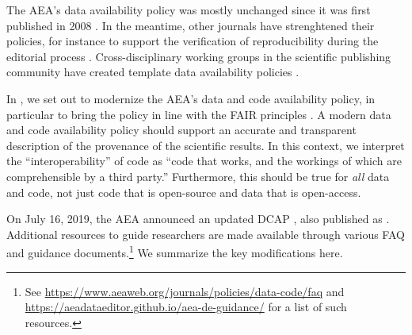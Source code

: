 \documentclass[PP]{AEA}
\begin{document}
The \ac{AEA}'s data availability policy was mostly unchanged since it was first published in 2008 \citep{American_Economic_Association2008-wayback}. In the meantime, other journals have strenghtened their policies, for instance to support the verification of reproducibility during the editorial process \citep{JacobyInsideHigherEd2017,Christian2018}. Cross-disciplinary working groups in the scientific publishing community have created template data availability policies \citep{HrynaszkiewiczInt.J.Digit.Curation2017}. 

In  \citet{10.1257/pandp.109.718}, we set out to modernize the AEA's data and code availability policy, in particular to bring the policy in line with  the \ac{FAIR} principles \citep{FORCE11FAIRDATAPRINCIPLES}.  A modern data and code availability policy should support an accurate and transparent description of the provenance of the scientific results.  In this context, we interpret the ``interoperability'' of code as ``code that works, and the workings of which are comprehensible by a third party.'' Furthermore, this should be true for \textit{all} data and code, not just code that is open-source and data that is open-access.


On July 16, 2019, the AEA announced an updated \ac{DCAP} \citep{AEA-announcement-July-2019}, also published as \citet{10.1257/pandp.110.dcap}. Additional resources to guide researchers are made available through various \ac{FAQ} and guidance documents.\footnote{See \url{https://www.aeaweb.org/journals/policies/data-code/faq} and \url{https://aeadataeditor.github.io/aea-de-guidance/} for a list of such resources.} We summarize the key modifications here.
\end{document}
